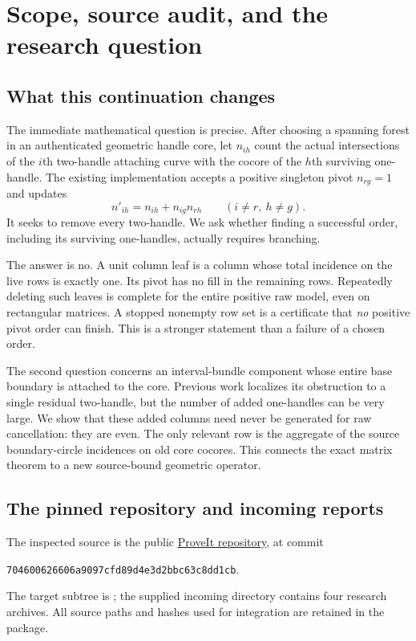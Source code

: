 \section{Scope, source audit, and the research question}
\label{sec:position}

\subsection{What this continuation changes}

The immediate mathematical question is precise. After choosing a spanning
forest in an authenticated geometric handle core, let $n_{ih}$ count the
actual intersections of the $i$th two-handle attaching curve with the
cocore of the $h$th surviving one-handle. The existing implementation accepts
a positive singleton pivot $n_{rg}=1$ and updates
\begin{equation}\label{eq:positive-pivot}
 n'_{ih}=n_{ih}+n_{ig}n_{rh}\qquad(i\ne r,\ h\ne g).
\end{equation}
It seeks to remove every two-handle. We ask whether finding a successful
order, including its surviving one-handles, actually requires branching.

The answer is no. A unit column leaf is a column whose total incidence on
the live rows is exactly one. Its pivot has no fill in the remaining rows.
Repeatedly deleting such leaves is complete for the entire positive raw
model, even on rectangular matrices. A stopped nonempty row set is a
certificate that \emph{no} positive pivot order can finish. This is a stronger
statement than a failure of a chosen order.

The second question concerns an interval-bundle component whose entire base
boundary is attached to the core. Previous work localizes its obstruction
to a single residual two-handle, but the number of added one-handles can
be very large. We show that these added columns need never be generated
for raw cancellation: they are even. The only relevant row is the aggregate
of the source boundary-circle incidences on old core cocores. This connects
the exact matrix theorem to a new source-bound geometric operator.

\subsection{The pinned repository and incoming reports}

The inspected source is the public
\href{https://github.com/VladimirReshetnikov/ProveIt}{ProveIt repository},
at commit
\begin{center}\texttt{704600626606a9097cfd89d4e3d2bbc63c8dd1cb}.\end{center}
The target subtree is ; the supplied
incoming directory contains four research archives\cite{repo,incoming}.
All source paths and hashes used for integration are retained in the package.

